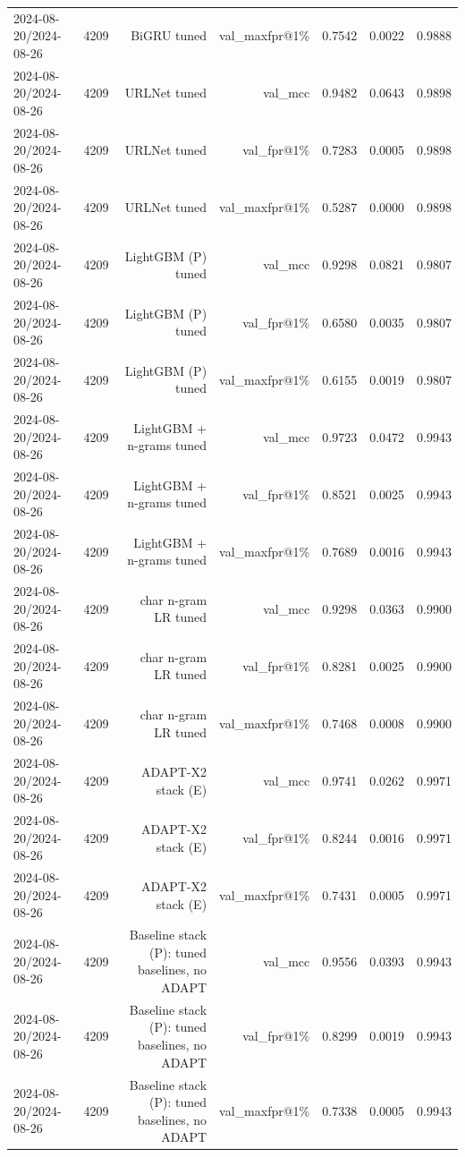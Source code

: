 \begin{table}[t]
\begin{tabular}{llrrrrr}
2024-08-20/2024-08-26 & 4209 & BiGRU tuned & val\_maxfpr@1\% & 0.7542 & 0.0022 & 0.9888 \\
2024-08-20/2024-08-26 & 4209 & URLNet tuned & val\_mcc & 0.9482 & 0.0643 & 0.9898 \\
2024-08-20/2024-08-26 & 4209 & URLNet tuned & val\_fpr@1\% & 0.7283 & 0.0005 & 0.9898 \\
2024-08-20/2024-08-26 & 4209 & URLNet tuned & val\_maxfpr@1\% & 0.5287 & 0.0000 & 0.9898 \\
2024-08-20/2024-08-26 & 4209 & LightGBM (P) tuned & val\_mcc & 0.9298 & 0.0821 & 0.9807 \\
2024-08-20/2024-08-26 & 4209 & LightGBM (P) tuned & val\_fpr@1\% & 0.6580 & 0.0035 & 0.9807 \\
2024-08-20/2024-08-26 & 4209 & LightGBM (P) tuned & val\_maxfpr@1\% & 0.6155 & 0.0019 & 0.9807 \\
2024-08-20/2024-08-26 & 4209 & LightGBM + n-grams tuned & val\_mcc & 0.9723 & 0.0472 & 0.9943 \\
2024-08-20/2024-08-26 & 4209 & LightGBM + n-grams tuned & val\_fpr@1\% & 0.8521 & 0.0025 & 0.9943 \\
2024-08-20/2024-08-26 & 4209 & LightGBM + n-grams tuned & val\_maxfpr@1\% & 0.7689 & 0.0016 & 0.9943 \\
2024-08-20/2024-08-26 & 4209 & char n-gram LR tuned & val\_mcc & 0.9298 & 0.0363 & 0.9900 \\
2024-08-20/2024-08-26 & 4209 & char n-gram LR tuned & val\_fpr@1\% & 0.8281 & 0.0025 & 0.9900 \\
2024-08-20/2024-08-26 & 4209 & char n-gram LR tuned & val\_maxfpr@1\% & 0.7468 & 0.0008 & 0.9900 \\
2024-08-20/2024-08-26 & 4209 & ADAPT-X2 stack (E) & val\_mcc & 0.9741 & 0.0262 & 0.9971 \\
2024-08-20/2024-08-26 & 4209 & ADAPT-X2 stack (E) & val\_fpr@1\% & 0.8244 & 0.0016 & 0.9971 \\
2024-08-20/2024-08-26 & 4209 & ADAPT-X2 stack (E) & val\_maxfpr@1\% & 0.7431 & 0.0005 & 0.9971 \\
2024-08-20/2024-08-26 & 4209 & Baseline stack (P): tuned baselines, no ADAPT & val\_mcc & 0.9556 & 0.0393 & 0.9943 \\
2024-08-20/2024-08-26 & 4209 & Baseline stack (P): tuned baselines, no ADAPT & val\_fpr@1\% & 0.8299 & 0.0019 & 0.9943 \\
2024-08-20/2024-08-26 & 4209 & Baseline stack (P): tuned baselines, no ADAPT & val\_maxfpr@1\% & 0.7338 & 0.0005 & 0.9943 \\

\end{tabular}
\end{table}
